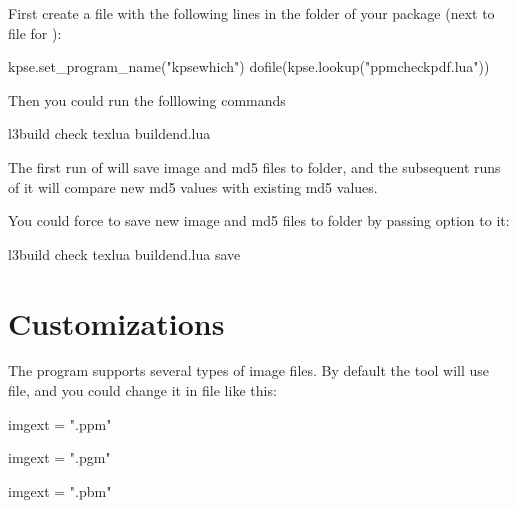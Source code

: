 \documentclass[oneside,12pt]{article}
\begin{document}
First create a  file with the following lines in the folder of your package
(next to  file for ):
\begin{codehigh}
kpse.set_program_name("kpsewhich")
dofile(kpse.lookup("ppmcheckpdf.lua"))
\end{codehigh}
Then you could run the folllowing commands
\begin{codehigh}
l3build check
texlua buildend.lua
\end{codehigh}

The first run of  will save image and md5 files to  folder,
and the subsequent runs of it will compare new md5 values with existing md5 values.

You could force  to save new image and md5 files to  folder
by passing  option to it:
\begin{codehigh}
l3build check
texlua buildend.lua save
\end{codehigh}

\section{Customizations}

The  program supports several types of image files.
By default the  tool will use  file,
and you could change it in  file like this:
\begin{codehigh}
imgext = ".ppm"
\end{codehigh}
\begin{codehigh}
imgext = ".pgm"
\end{codehigh}
\begin{codehigh}
imgext = ".pbm"
\end{codehigh}
\end{document}
